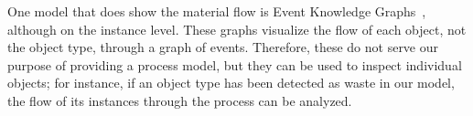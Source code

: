 One model that does show the material flow is Event Knowledge Graphs~\autocite{fahland2022}, although on the instance level.
These graphs visualize the flow of each object, not the object type, through a graph of events.
Therefore, these do not serve our purpose of providing a process model, but they can be used to inspect individual objects; for instance, if an object type has been detected as waste in our model, the flow of its instances through the process can be analyzed.

\enlargethispage{2\baselineskip}
